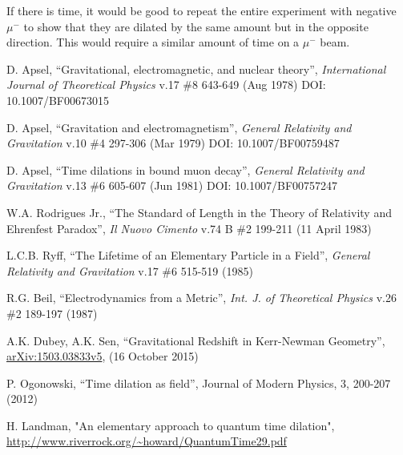\documentclass[12pt]{amsart}
\theoremstyle{plain}
\theoremstyle{definition}
\theoremstyle{remark}
\begin{document}
If there is time, it would be good to repeat the entire experiment with negative $\mu^-$
to show that they are dilated by the same amount but in the opposite direction.
This would require a similar amount of time on a $\mu^-$ beam.

\begin{thebibliography}{10}

D. Apsel,
``Gravitational, electromagnetic, and nuclear theory'',
{\em 	International Journal of Theoretical Physics} v.17 \#8 643-649 (Aug 1978)
DOI: 	10.1007/BF00673015

D. Apsel,
``Gravitation and electromagnetism'',
{\em General Relativity and Gravitation} v.10 \#4 297-306 (Mar 1979)
DOI: 10.1007/BF00759487

D. Apsel,
``Time dilations in bound muon decay'',
{\em General Relativity and Gravitation} v.13 \#6 605-607 (Jun 1981)
DOI: 10.1007/BF00757247

W.A. Rodrigues Jr.,
``The Standard of Length in the Theory of Relativity and Ehrenfest Paradox'',
{\em Il Nuovo Cimento} v.74 B \#2 199-211 (11 April 1983)

L.C.B. Ryff,
``The Lifetime of an Elementary Particle in a Field'',
{\em General Relativity and Gravitation} v.17 \#6 515-519 (1985)

R.G. Beil,
``Electrodynamics from a Metric'',
{\em Int. J. of Theoretical Physics} v.26 \#2 189-197 (1987)



A.K. Dubey, A.K. Sen,
``Gravitational Redshift in Kerr-Newman Geometry'',
\url{arXiv:1503.03833v5}, (16 October 2015)

P. Ogonowski,
``Time dilation as field'',
Journal of Modern Physics, 3, 200-207 (2012)


H. Landman,
"An elementary approach to quantum time dilation",
\url{http://www.riverrock.org/~howard/QuantumTime29.pdf}


\end{thebibliography}
\end{document}
